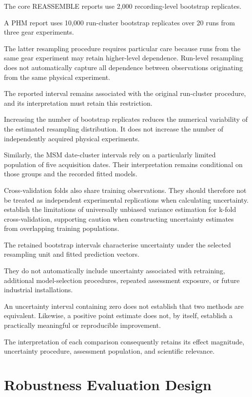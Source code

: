 The core REASSEMBLE reports use 2,000 recording-level bootstrap replicates.

A PHM report uses 10,000 run-cluster bootstrap replicates over 20 runs from three gear experiments.

The latter resampling procedure requires particular care because runs from the same gear experiment may retain higher-level dependence. Run-level resampling does not automatically capture all dependence between observations originating from the same physical experiment.

The reported interval remains associated with the original run-cluster procedure, and its interpretation must retain this restriction.

Increasing the number of bootstrap replicates reduces the numerical variability of the estimated resampling distribution. It does not increase the number of independently acquired physical experiments.

Similarly, the MSM date-cluster intervals rely on a particularly limited population of five acquisition dates. Their interpretation remains conditional on those groups and the recorded fitted models.

Cross-validation folds also share training observations. They should therefore not be treated as independent experimental replications when calculating uncertainty. \textcite{Bengio2004CVVariance} establish the limitations of universally unbiased variance estimation for k-fold cross-validation, supporting caution when constructing uncertainty estimates from overlapping training populations.

The retained bootstrap intervals characterise uncertainty under the selected resampling unit and fitted prediction vectors.

They do not automatically include uncertainty associated with retraining, additional model-selection procedures, repeated assessment exposure, or future industrial installations.

An uncertainty interval containing zero does not establish that two methods are equivalent. Likewise, a positive point estimate does not, by itself, establish a practically meaningful or reproducible improvement.

The interpretation of each comparison consequently retains its effect magnitude, uncertainty procedure, assessment population, and scientific relevance.

\section{Robustness Evaluation Design}
\label{sec:ch4-robustness}

